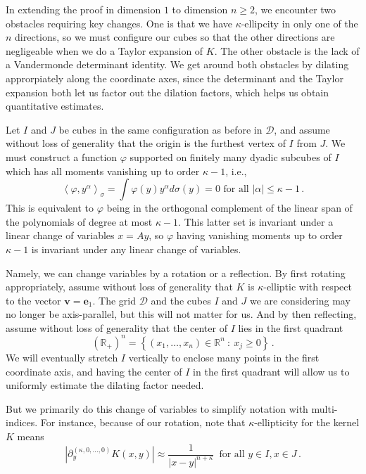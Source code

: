 \documentclass{amsart}%
\theoremstyle{plain}
\numberwithin{equation}{section}
\begin{document}
In extending the proof in dimension $1$ to dimension $n\geq 2$, we encounter two obstacles requiring key changes. One is that we have $\kappa$-ellipcity in only one of the $n$ directions, so we must configure our cubes so that the other directions are negligeable when we do a Taylor expansion of $K$. The other obstacle is the lack of a Vandermonde determinant identity. We get around both obstacles by dilating approrpiately along the coordinate axes, since the determinant and the Taylor expansion both let us factor out the dilation factors, which helps us obtain quantitative estimates. 

Let $I$ and $J$ be cubes in the same configuration as before in $\mathcal{D}$, and assume without loss of generality that the origin is the furthest vertex of $I$ from $J$. We must construct a function $\varphi$ supported on finitely many dyadic subcubes of $I$ which has all moments vanishing up to order $\kappa-1$, i.e.,
\[
	\left \langle \varphi, y^{\alpha} \right \rangle_{\sigma} = \int \varphi (y) y^{\alpha} d \sigma \left ( y \right )  = 0 \text{ for all } \left | \alpha \right |\leq \kappa-1 \, .
\]
This is equivalent to $\varphi$ being in the orthogonal complement of the linear span of the polynomials of degree at most $\kappa -1$. This latter set is invariant under a linear change of variables $x=Ay$, so $\varphi$ having vanishing moments up to order $\kappa-1$ is invariant under any linear change of variables.

Namely, we can change variables by a rotation or a reflection. By first rotating appropriately, assume without loss of generality that $K$ is $\kappa$-elliptic with respect to the vector $\mathbf{v} = \mathbf{e}_1$. The grid $\mathcal{D}$ and the cubes $I$ and $J$ we are considering may no longer be axis-parallel, but this will not matter for us. And by then reflecting, assume without loss of generality that the center of $I$ lies in the first quadrant 
\[
	\left ( \mathbb{R}_+ \right )^n = \left \{ (x_1, \ldots, x_n) \in \mathbb{R}^n ~:~ x_j \geq 0 \right \} \, .
\]
We will eventually stretch $I$ vertically to enclose many points in the first coordinate axis, and having the center of $I$ in the first quadrant will allow us to uniformly estimate the dilating factor needed.

But we primarily do this change of variables to simplify notation with multi-indices. For instance, because of our rotation, note that $\kappa$-ellipticity for the kernel $K$ means  
\[
	\left | \partial^{(\kappa ,0,\ldots, 0)} _{y} K (x,y) \right | \approx \frac{1}{\left | x - y \right|^{n+\kappa}} \, \text{ for all } y \in I, x \in J \, . 
\]
 
\end{document}
